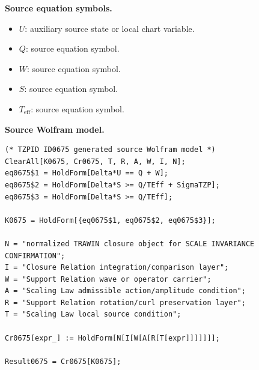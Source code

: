 \begin{minipage}[t]{0.49\linewidth}
\begingroup
\small
\raggedright
\textbf{Source equation symbols.}\par
\begin{itemize}[leftmargin=1.35em,itemsep=1pt,topsep=1pt,parsep=0pt]
    \item $U$: auxiliary source state or local chart variable.
    \item $Q$: source equation symbol.
    \item $W$: source equation symbol.
    \item $S$: source equation symbol.
    \item $T_{\mathrm{eff}}$: source equation symbol.
\end{itemize}
\endgroup
\end{minipage}\hfill
\begin{minipage}[t]{0.47\linewidth}
\begingroup
\scriptsize
\raggedright
\textbf{Source Wolfram model.}\par
\begin{Verbatim}[fontsize=\tiny,breaklines=true,breakanywhere=true]
(* TZPID ID0675 generated source Wolfram model *)
ClearAll[K0675, Cr0675, T, R, A, W, I, N];
eq0675$1 = HoldForm[Delta*U == Q + W];
eq0675$2 = HoldForm[Delta*S >= Q/TEff + SigmaTZP];
eq0675$3 = HoldForm[Delta*S >= Q/TEff];

K0675 = HoldForm[{eq0675$1, eq0675$2, eq0675$3}];

N = "normalized TRAWIN closure object for SCALE INVARIANCE CONFIRMATION";
I = "Closure Relation integration/comparison layer";
W = "Support Relation wave or operator carrier";
A = "Scaling Law admissible action/amplitude condition";
R = "Support Relation rotation/curl preservation layer";
T = "Scaling Law local source condition";

Cr0675[expr_] := HoldForm[N[I[W[A[R[T[expr]]]]]]];

Result0675 = Cr0675[K0675];
\end{Verbatim}
\endgroup
\end{minipage}


